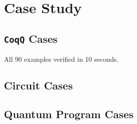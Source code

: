 
\section{Case Study}

\subsection{\texttt{CoqQ} Cases}

All 90 examples verified in 10 seconds.

\subsection{Circuit Cases}

\subsection{Quantum Program Cases}
